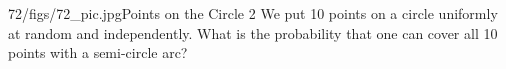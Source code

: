 \begin{problem}{72/figs/72_pic.jpg}{Points on the Circle 2} We put 10  points on a circle uniformly at random and independently. What is the probability that one can cover all 10 points with a semi-circle arc?
\end{problem}
